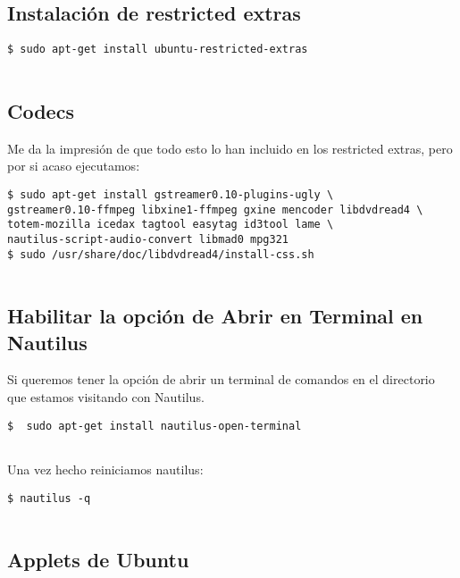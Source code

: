 \subsection{Instalación de restricted
extras}\label{instalaciuxf3n-de-restricted-extras}

\begin{verbatim}
$ sudo apt-get install ubuntu-restricted-extras
      
\end{verbatim}

\subsection{Codecs}\label{codecs}

Me da la impresión de que todo esto lo han incluido en los restricted
extras, pero por si acaso ejecutamos:

\begin{verbatim}
$ sudo apt-get install gstreamer0.10-plugins-ugly \
gstreamer0.10-ffmpeg libxine1-ffmpeg gxine mencoder libdvdread4 \
totem-mozilla icedax tagtool easytag id3tool lame \
nautilus-script-audio-convert libmad0 mpg321
$ sudo /usr/share/doc/libdvdread4/install-css.sh
      
\end{verbatim}

\subsection{Habilitar la opción de Abrir en Terminal en
Nautilus}\label{habilitar-la-opciuxf3n-de-abrir-en-terminal-en-nautilus}

Si queremos tener la opción de abrir un terminal de comandos en el
directorio que estamos visitando con Nautilus.

\begin{verbatim}
$  sudo apt-get install nautilus-open-terminal
      
\end{verbatim}

Una vez hecho reiniciamos nautilus:

\begin{verbatim}
$ nautilus -q
      
\end{verbatim}

\subsection{Applets de Ubuntu}\label{applets-de-ubuntu}

